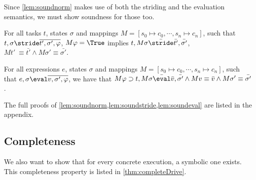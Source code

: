 Since \cref{lem:soundnorm} makes use of both the striding and the evaluation semantics,
we must show soundness for those too.

\begin{lemma}
  \label{lem:soundstride}

  For all tasks $t$, states $\sigma$ and mappings $M=[s_0\mapsto c_0,\cdots,s_n\mapsto c_n]$,
  such that $t,\sigma\stride \overline{t',\sigma',\phi}$,
  $M \phi= \True$ implies
  $t,M\sigma \bar{\stride}\bar{t'},\bar{\sigma'}$, $M t'\ \equiv \bar{t'} \land M\sigma' \equiv \bar{\sigma'}$.

\end{lemma}

\begin{lemma}
  \label{lem:soundeval}

  For all expressions $e$, states $\sigma$ and mappings $M=[s_0\mapsto c_0,\cdots,s_n\mapsto c_n]$,
  such that $e,\sigma\eval \overline{v,\sigma',\phi}$,
  we have that $M\phi \implies t,M\sigma \bar{\eval}\bar{v},\bar{\sigma'} \land Mv \equiv \bar{v} \wedge M\sigma' \equiv \bar{\sigma'}$.

\end{lemma}

The full proofs of \cref{lem:soundnorm,lem:soundstride,lem:soundeval} are listed in the appendix.





\subsection{Completeness}

We also want to show that for every concrete execution, a symbolic one exists.
This completeness property is listed in \cref{thm:completeDrive}.

%

